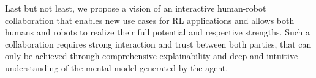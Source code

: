 \documentclass[twoside,11pt]{article}
\begin{document}
Last but not least, we propose a vision of an interactive human-robot collaboration that enables new use cases for RL applications and allows both humans and robots to realize their full potential and respective strengths. Such a collaboration requires strong interaction and trust between both parties, that can only be achieved through comprehensive explainability and deep and intuitive understanding of the mental model generated by the agent.

\end{document}
